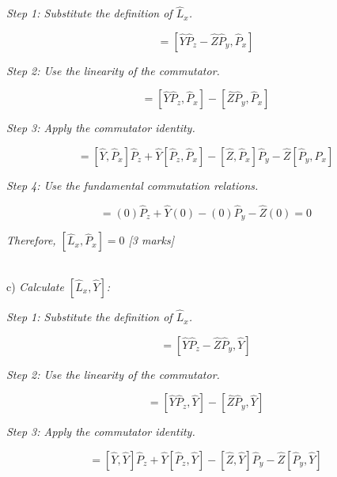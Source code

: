 \documentclass{article}
\begin{document}
\textit{Step 1: Substitute the definition of $\hat{L}_x$.}

\begin{equation}
[\hat{L}_x, \hat{P}_x] = [\hat{Y}\hat{P}_z - \hat{Z}\hat{P}_y, \hat{P}_x]
\end{equation}

\textit{Step 2: Use the linearity of the commutator.}

\begin{equation}
[\hat{L}_x, \hat{P}_x] = [\hat{Y}\hat{P}_z, \hat{P}_x] - [\hat{Z}\hat{P}_y, \hat{P}_x]
\end{equation}

\textit{Step 3: Apply the commutator identity.}

\begin{equation}
[\hat{L}_x, \hat{P}_x] = [\hat{Y}, \hat{P}_x]\hat{P}_z + \hat{Y}[\hat{P}_z, \hat{P}_x] - [\hat{Z}, \hat{P}_x]\hat{P}_y - \hat{Z}[\hat{P}_y, \hat{P}_x]
\end{equation}

\textit{Step 4: Use the fundamental commutation relations.}

\begin{equation}
[\hat{L}_x, \hat{P}_x] = (0)\hat{P}_z + \hat{Y}(0) - (0)\hat{P}_y - \hat{Z}(0) = 0
\end{equation}

\textit{Therefore, $[\hat{L}_x, \hat{P}_x] = 0$ [3 marks]}

\\

c) \textit{Calculate $[\hat{L}_x, \hat{Y}]$:}

\textit{Step 1: Substitute the definition of $\hat{L}_x$.}

\begin{equation}
[\hat{L}_x, \hat{Y}] = [\hat{Y}\hat{P}_z - \hat{Z}\hat{P}_y, \hat{Y}]
\end{equation}

\textit{Step 2: Use the linearity of the commutator.}

\begin{equation}
[\hat{L}_x, \hat{Y}] = [\hat{Y}\hat{P}_z, \hat{Y}] - [\hat{Z}\hat{P}_y, \hat{Y}]
\end{equation}

\textit{Step 3: Apply the commutator identity.}

\begin{equation}
[\hat{L}_x, \hat{Y}] = [\hat{Y}, \hat{Y}]\hat{P}_z + \hat{Y}[\hat{P}_z, \hat{Y}] - [\hat{Z}, \hat{Y}]\hat{P}_y - \hat{Z}[\hat{P}_y, \hat{Y}]
\end{equation}
\end{document}
